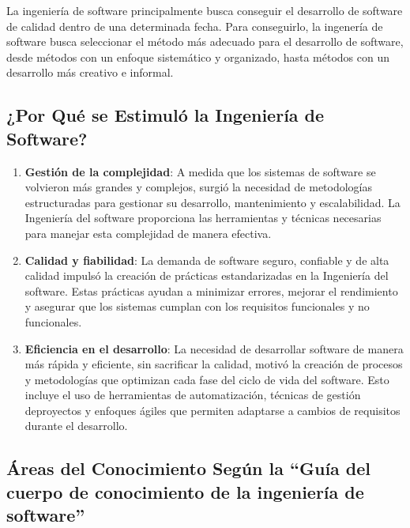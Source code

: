 \documentclass[11pt, a4paper]{article} %
\begin{document}
    La ingeniería de software principalmente busca conseguir el desarrollo de software de
    calidad dentro de una determinada fecha. Para conseguirlo, la ingenería de software
    busca seleccionar el método más adecuado para el desarrollo de software, desde métodos
    con un enfoque sistemático y organizado, hasta métodos con un desarrollo más creativo
    e informal.

    \subsection{¿Por Qué se Estimuló la Ingeniería de Software?}

    \begin{enumerate}
        \item \textbf{Gestión de la complejidad}: A medida que los sistemas de software se
            volvieron más grandes y complejos, surgió la necesidad de metodologías
            estructuradas para gestionar su desarrollo, mantenimiento y escalabilidad. La
            Ingeniería del software proporciona las herramientas y técnicas necesarias
            para manejar esta complejidad de manera efectiva.

        \item \textbf{Calidad y fiabilidad}: La demanda de software seguro, confiable y de
            alta calidad impulsó la creación de prácticas estandarizadas en la Ingeniería
            del software. Estas prácticas ayudan a minimizar errores, mejorar el
            rendimiento y asegurar que los sistemas cumplan con los requisitos funcionales
            y no funcionales.

        \item \textbf{Eficiencia en el desarrollo}: La necesidad de desarrollar software de
            manera más rápida y eficiente, sin sacrificar la calidad, motivó la creación de
            procesos y metodologías que optimizan cada fase del ciclo de vida del software.
            Esto incluye el uso de herramientas de automatización, técnicas de gestión deproyectos
            y enfoques ágiles que permiten adaptarse a cambios de requisitos durante el desarrollo.
    \end{enumerate}

    \subsection{ Áreas del Conocimiento Según la ``Guía del cuerpo de conocimiento de la ingeniería
    de software'' }
\end{document}

